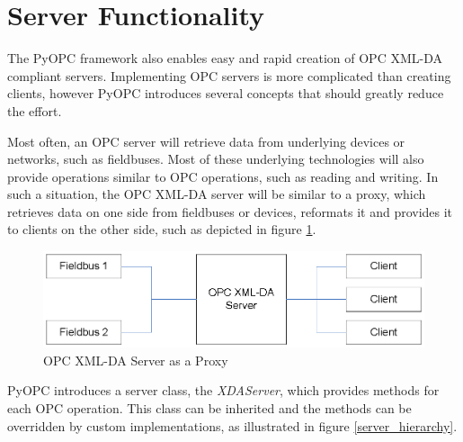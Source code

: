 
\section {Server Functionality}
\thispagestyle{plain}

The PyOPC framework also enables easy and rapid creation of OPC XML-DA
compliant servers. Implementing OPC servers is more complicated than
creating clients, however PyOPC introduces several concepts that
should greatly reduce the effort.

Most often, an OPC server will retrieve data from underlying devices
or networks, such as fieldbuses. Most of these underlying technologies
will also provide operations similar to OPC operations, such as
reading and writing. In such a situation, the OPC XML-DA server will
be similar to a proxy, which retrieves data on one side from
fieldbuses or devices, reformats it and provides it to clients on the
other side, such as depicted in figure \ref{opc_proxy}.

\begin{figure}[ht]
\centering
\includegraphics[scale=0.7]{graphics/opc_proxy.eps}
\caption{OPC XML-DA Server as a Proxy}
\label {opc_proxy} 
\end{figure}

PyOPC introduces a server class, the {\sl XDAServer}, which provides
methods for each OPC operation. This class can be inherited and the
methods can be overridden by custom implementations, as illustrated
in figure \ref{server_hierarchy}.

